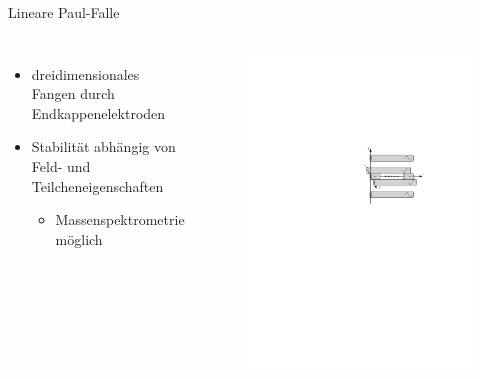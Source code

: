 \documentclass[12pt,xcolor=dvipsnames]{beamer}
\begin{document}
\begin{frame}{Lineare Paul-Falle}
	\begin{columns}[c]
		\begin{itemize}
				\item dreidimensionales Fangen durch Endkappenelektroden
				
				\item Stabilität abhängig von Feld- und Teilcheneigenschaften
				\begin{itemize}
					\item Massenspektrometrie möglich
				\end{itemize}
		\end{itemize}
		
			\vspace{-0.4cm}
			\begin{figure}[h]
				\centering
				\includegraphics[width=1\textwidth]{./figures/lineare_paulfalle.pdf}
			\end{figure}
	\end{columns}
	

\end{frame}
\end{document}
